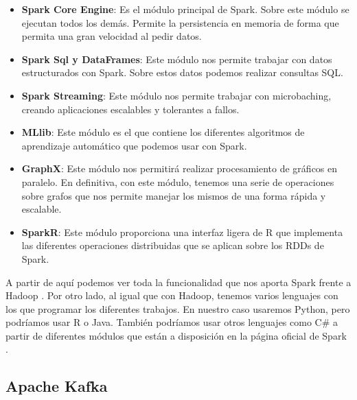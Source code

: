 \begin{itemize}
	\item \textbf{Spark Core Engine}: Es el módulo principal de Spark. Sobre este módulo se ejecutan todos los demás. Permite la persistencia en memoria de forma que permita una gran velocidad al pedir datos.\par
	\item \textbf{Spark Sql y DataFrames}: Este módulo nos permite trabajar con datos estructurados con Spark. Sobre estos datos podemos realizar consultas SQL.\par
	\item \textbf{Spark Streaming}: Este módulo nos permite trabajar con microbaching, creando aplicaciones escalables y tolerantes a fallos.
	\item \textbf{MLlib}: Este módulo es el que contiene los diferentes algoritmos de aprendizaje automático que podemos usar con Spark.
	\item \textbf{GraphX}: Este módulo nos permitirá realizar procesamiento de gráficos en paralelo. En definitiva, con este módulo, tenemos una serie de operaciones sobre grafos que nos permite manejar los mismos de una forma rápida y escalable.
	\item \textbf{SparkR}: Este módulo proporciona una interfaz ligera de R que implementa las diferentes operaciones distribuidas que se aplican sobre los RDDs de Spark.
\end{itemize}

A partir de aquí podemos ver toda la funcionalidad que nos aporta Spark frente a Hadoop \cite{Spk-7}. Por otro lado, al igual que con Hadoop, tenemos varios lenguajes con los que programar los diferentes trabajos. En nuestro caso usaremos Python, pero podríamos usar R o Java. También podríamos usar otros lenguajes como C\# a partir de diferentes módulos que están a disposición en la página oficial de Spark \cite{Spk-6}.\par


\subsection{Apache Kafka\label{Kafka}}

